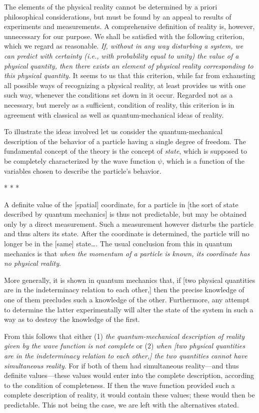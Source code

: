 The elements of the physical reality cannot be determined by a priori
philosophical considerations, but must be found by an appeal to results
of experiments and measurements. A comprehensive definition of reality
is, however, unnecessary for our purpose. We shall be satisfied with the
following criterion, which we regard as reasonable. \emph{If, without in
any way disturbing a system, we can predict with certainty (i.e.,}
\emph{with probability equal to unity) the value of a physical}
\emph{quantity, then there exists an element of physical} \emph{reality
corresponding to this physical quantity.} It seems to us that this
criterion, while far from exhausting all possible ways of recognizing a
physical reality, at least provides us with one such way, whenever the
conditions set down in it occur. Regarded not as a necessary, but merely
as a sufficient, condition of reality, this criterion is in agreement
with classical as well as quantum-mechanical ideas of reality.

To illustrate the ideas involved let us consider the quantum-mechanical
description of the behavior of a particle having a single degree of
freedom. The fundamental concept of the theory is the concept of
\emph{state}, which is supposed to be completely characterized by the
wave function $\psi$, which is a function of the variables chosen to
describe the particle's behavior.\\
\centerline{* * *}
%
A definite value of the [spatial] coordinate, for a particle in [the sort of state
described by quantum mechanics] is thus not predictable, but may be obtained
only by a direct measurement. Such a measurement however disturbs the
particle and thus alters its state. After the coordinate is determined,
the particle will no longer be in the {[}same{]} state\ldots. The usual
conclusion from this in quantum mechanics is that \emph{when the
momentum of a particle is known, its coordinate has no physical
reality}.

More generally, it is shown in quantum mechanics that, if {[}two
physical quantities are in the indeterminacy relation to each other,{]}
then the precise knowledge of one of them precludes such a knowledge of
the other. Furthermore, any attempt to determine the latter
experimentally will alter the state of the system in such a way as to
destroy the knowledge of the first.

From this follows that either (1) \emph{the quantum-mechanical
description of reality given by the wave function is not complete} or
(2) \emph{when {[}two physical quantities are in the indeterminacy
relation to each other,{]} the two quantities cannot have simultaneous
reality}. For if both of them had simultaneous reality---and thus
definite values---these values would enter into the complete
description, according to the condition of completeness. If then the
wave function provided such a complete description of reality, it would
contain these values; these would then be predictable. This not being
the case, we are left with the alternatives stated.

